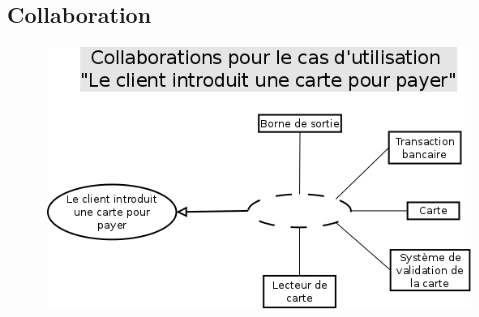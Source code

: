 \documentclass[a4paper]{article}
\begin{document}
\subsection{Collaboration}
\begin{figure}[!ht]
\centering
\includegraphics[scale=.5]{collaborations/_carte.png}
\end{figure}
\end{document}
